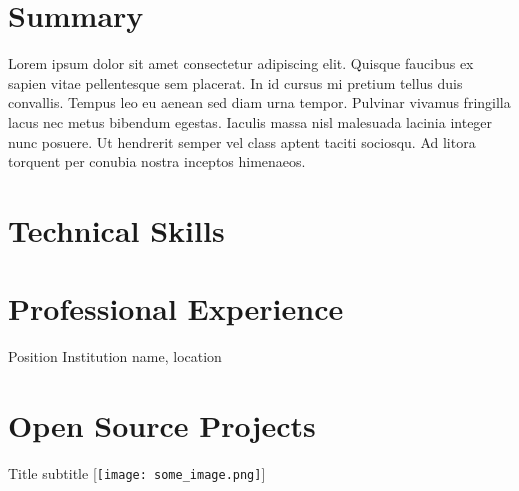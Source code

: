 \documentclass{../source/fp-cv}
\author{john}{doe}
\begin{document}
\noindent
\begin{multicols}{2}
  \noindent
\end{multicols}
\vspace{-13pt}

\section{Summary}

Lorem ipsum dolor sit amet consectetur adipiscing elit. Quisque faucibus ex sapien vitae pellentesque sem placerat. In id cursus mi pretium tellus duis convallis. Tempus leo eu aenean sed diam urna tempor. Pulvinar vivamus fringilla lacus nec metus bibendum egestas. Iaculis massa nisl malesuada lacinia integer nunc posuere. Ut hendrerit semper vel class aptent taciti sociosqu. Ad litora torquent per conubia nostra inceptos himenaeos.

\section{Technical Skills}





\section{Professional Experience}

%
{Position}%
{Institution name, location}

\section{Open Source Projects}

%
{Title}%
{subtitle}
[\texttt{[image: some\_image.png]}]
\end{document}
